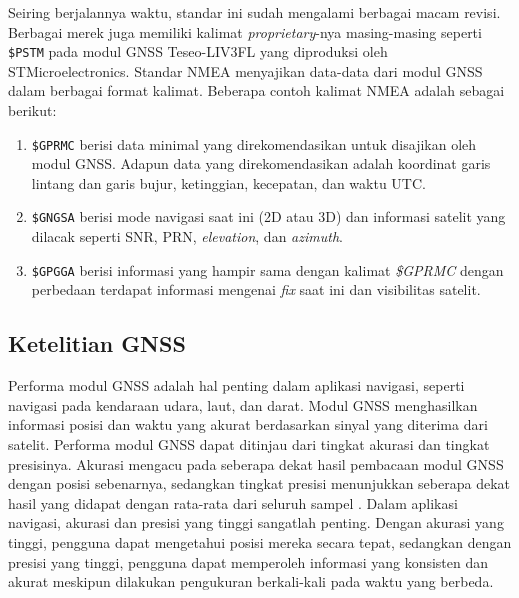 Seiring berjalannya waktu, standar ini sudah mengalami berbagai macam revisi. Berbagai merek juga memiliki kalimat \textit{proprietary}-nya masing-masing seperti \texttt{\$PSTM} pada modul GNSS Teseo-LIV3FL yang diproduksi oleh STMicroelectronics. Standar NMEA menyajikan data-data dari modul GNSS dalam berbagai format kalimat. Beberapa contoh kalimat NMEA adalah sebagai berikut:
\begin{enumerate}
	\item \texttt{\$GPRMC} berisi data minimal yang direkomendasikan untuk disajikan oleh modul GNSS. Adapun data yang direkomendasikan adalah koordinat garis lintang dan garis bujur, ketinggian, kecepatan, dan waktu UTC.
	\item \texttt{\$GNGSA} berisi mode navigasi saat ini (2D atau 3D) dan informasi satelit yang dilacak seperti SNR, PRN, \textit{elevation}, dan \textit{azimuth}.
	\item \texttt{\$GPGGA} berisi informasi yang hampir sama dengan kalimat \textit{\$GPRMC} dengan perbedaan terdapat informasi mengenai \textit{fix} saat ini dan visibilitas satelit.
\end{enumerate}

\subsection{Ketelitian GNSS}
Performa modul GNSS adalah hal penting dalam aplikasi navigasi, seperti navigasi pada kendaraan udara, laut, dan darat. Modul GNSS menghasilkan informasi posisi dan waktu yang akurat berdasarkan sinyal yang diterima dari satelit. Performa modul GNSS dapat ditinjau dari tingkat akurasi dan tingkat presisinya. Akurasi mengacu pada seberapa dekat hasil pembacaan modul GNSS dengan posisi sebenarnya, sedangkan tingkat presisi menunjukkan seberapa dekat hasil yang didapat dengan rata-rata dari seluruh sampel \cite{Novatel2023}. Dalam aplikasi navigasi, akurasi dan presisi yang tinggi sangatlah penting. Dengan akurasi yang tinggi, pengguna dapat mengetahui posisi mereka secara tepat, sedangkan dengan presisi yang tinggi, pengguna dapat memperoleh informasi yang konsisten dan akurat meskipun dilakukan pengukuran berkali-kali pada waktu yang berbeda.

